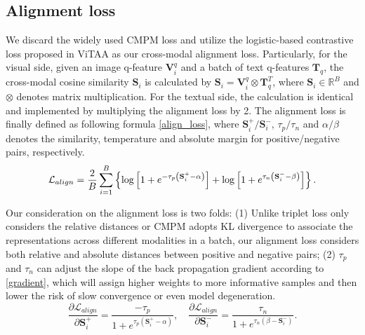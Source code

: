 \documentclass{bmvc2k}
\begin{document}
\vspace*{-4mm}
\subsection{Alignment loss} We discard the widely used CMPM loss \cite{zhang2018cmpc} and utilize the logistic-based contrastive loss proposed in ViTAA \cite{wang2020vitaa} as our cross-modal alignment loss. Particularly, for the visual side, given an image q-feature $\mathbf{V}_i^q$ and a batch of text q-features $\mathbf{T}_q$, the cross-modal cosine similarity $\mathbf{S}_i$ is calculated by $\mathbf{S}_i=\mathbf{V}_i^q\otimes\mathbf{T}_q^T$, where $\mathbf{S}_i \in \mathbb{R}^B$ and $\otimes$ denotes matrix multiplication. For the textual side, the calculation is identical and implemented by multiplying the alignment loss by 2. The alignment loss is finally defined as following formula \ref{align_loss}, where $\mathbf{S}_i^{+}/\mathbf{S}_i^{-}$, $\tau_{p}/\tau_{n}$ and $\alpha/\beta$ denotes the similarity, temperature and absolute margin for positive/negative pairs, respectively.
\begin{equation}
\label{align_loss}
\small
\mathcal{L}_{align}=\frac{2}{B} \sum_{i=1}^{B}\left\{\log \left[1+e^{-\tau_{p}\left(\mathbf{S}_{i}^{+}-\alpha\right)}\right]+\log \left[1+e^{\tau_{n}\left(\mathbf{S}_{i}^{-}-\beta\right)}\right]\right\}.
\end{equation}

Our consideration on the alignment loss is two folds: (1) Unlike triplet loss only considers the relative distances or CMPM \cite{zhang2018cmpc} adopts KL divergence to associate the representations across different modalities in a batch, our alignment loss considers both relative and absolute distances between positive and negative pairs; (2) $\tau_{p}$ and $\tau_{n}$ can adjust the slope of the back propagation gradient according to \ref{gradient}, which will assign higher weights to more informative samples and then lower the risk of slow convergence or even model degeneration. 
\begin{equation}
\label{gradient}
\frac{\partial \mathcal{L}_{align}}{\partial \mathbf{S}_{i}^{+}}=\frac{-\tau_{p}}{1+e^{\tau_{p}\left(\mathbf{S}_{i}^{+}-\alpha\right)}},\quad \frac{\partial \mathcal{L}_{align}}{\partial \mathbf{S}_{i}^{-}}=\frac{\tau_{n}}{1+e^{\tau_{n}\left(\beta-\mathbf{S}_{i}^{-}\right)}}.
\end{equation}
\end{document}
